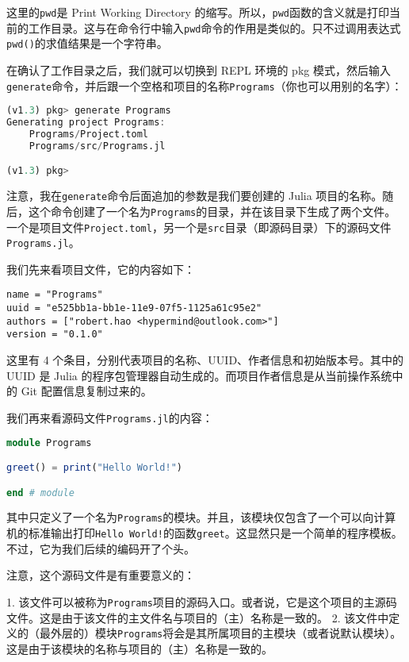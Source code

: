 这里的\verb|pwd|是 Print Working Directory 的缩写。所以，\verb|pwd|函数的含义就是打印当前的工作目录。这与在命令行中输入\verb|pwd|命令的作用是类似的。只不过调用表达式\verb|pwd()|的求值结果是一个字符串。

在确认了工作目录之后，我们就可以切换到 REPL 环境的 pkg 模式，然后输入\verb|generate|命令，并后跟一个空格和项目的名称\verb|Programs|（你也可以用别的名字）：

\begin{lstlisting}[language=julia]
(v1.3) pkg> generate Programs
Generating project Programs:
    Programs/Project.toml
    Programs/src/Programs.jl

(v1.3) pkg> 
\end{lstlisting}

注意，我在\verb|generate|命令后面追加的参数是我们要创建的 Julia 项目的名称。随后，这个命令创建了一个名为\verb|Programs|的目录，并在该目录下生成了两个文件。一个是项目文件\verb|Project.toml|，另一个是\verb|src|目录（即源码目录）下的源码文件\verb|Programs.jl|。

我们先来看项目文件，它的内容如下：

\begin{lstlisting}[language=none]
name = "Programs"
uuid = "e525bb1a-bb1e-11e9-07f5-1125a61c95e2"
authors = ["robert.hao <hypermind@outlook.com>"]
version = "0.1.0"
\end{lstlisting}

这里有 4 个条目，分别代表项目的名称、UUID、作者信息和初始版本号。其中的 UUID 是 Julia 的程序包管理器自动生成的。而项目作者信息是从当前操作系统中的 Git 配置信息复制过来的。

我们再来看源码文件\verb|Programs.jl|的内容：

\begin{lstlisting}[language=julia]
module Programs

greet() = print("Hello World!")

end # module
\end{lstlisting}

其中只定义了一个名为\verb|Programs|的模块。并且，该模块仅包含了一个可以向计算机的标准输出打印\verb|Hello World!|的函数\verb|greet|。这显然只是一个简单的程序模板。不过，它为我们后续的编码开了个头。

注意，这个源码文件是有重要意义的：

1. 该文件可以被称为\verb|Programs|项目的源码入口。或者说，它是这个项目的主源码文件。这是由于该文件的主文件名与项目的（主）名称是一致的。
2. 该文件中定义的（最外层的）模块\verb|Programs|将会是其所属项目的主模块（或者说默认模块）。这是由于该模块的名称与项目的（主）名称是一致的。

